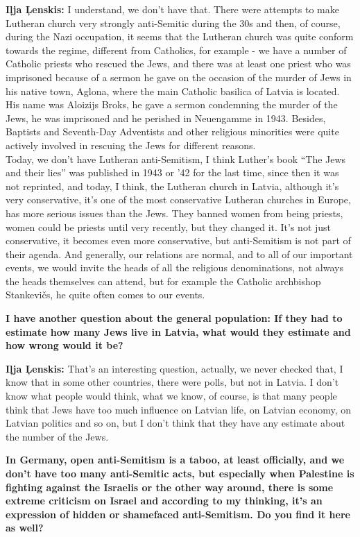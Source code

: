 \textbf{Iļja Ļenskis:} I understand, we don’t have that. There were attempts to make Lutheran church very strongly anti-Semitic during the 30s and then, of course, during the Nazi occupation, it seems that the Lutheran church was quite conform towards the regime, different from Catholics, for example - we have a number of Catholic priests who rescued the Jews, and there was at least one priest who was imprisoned because of a sermon he gave on the occasion of the murder of Jews in his native town, Aglona, where the main Catholic basilica of Latvia is located. His name was Aloizijs Broks, he gave a sermon condemning the murder of the Jews, he was imprisoned and he perished in Neuengamme in 1943. Besides, Baptists and Seventh-Day Adventists and other religious minorities were quite actively involved in rescuing the Jews for different reasons. \\
Today, we don’t have Lutheran anti-Semitism, I think Luther’s book ``The Jews and their lies'' was published in 1943 or '42 for the last time, since then it was not reprinted, and today, I think, the Lutheran church in Latvia, although it’s very conservative, it’s one of the most conservative Lutheran churches in Europe, has more serious issues than the Jews. They banned women from being priests, women could be priests until very recently, but they changed it. It's not just conservative, it becomes even more conservative, but anti-Semitism is not part of their agenda. And generally, our relations are normal, and to all of our important events, we would invite the heads of all the religious denominations, not always the heads themselves can attend, but for example the Catholic archbishop Stankevičs, he quite often comes to our events. 

\textbf{I have another question about the general population: If they had to estimate how many Jews live in Latvia, what would they estimate and how wrong would it be?}

\textbf{Iļja Ļenskis:} That’s an interesting question, actually, we never checked that, I know that in some other countries, there were polls, but not in Latvia. I don’t know what people would think, what we know, of course, is that many people think that Jews have too much influence on Latvian life, on Latvian economy, on Latvian politics and so on, but I don’t think that they have any estimate about the number of the Jews. 

\textbf{In Germany, open anti-Semitism is a taboo, at least officially, and we don’t have too many anti-Semitic acts, but especially when Palestine is fighting against the Israelis or the other way around, there is some extreme criticism on Israel and according to my thinking, it’s an expression of hidden or shamefaced anti-Semitism. Do you find it here as well?}

